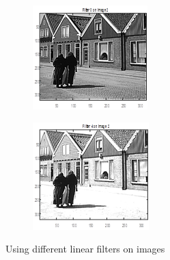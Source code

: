 \begin{figure}
\begin{subfigure}{0.4\textwidth}
        \caption{}
        \label{fig:Second}
    \end{subfigure}
    \vfill
    \begin{subfigure}{0.4\textwidth}
        \includegraphics[width=\textwidth]{Resources/F10-c.png}
        \caption{}
        \label{fig:first}
    \end{subfigure}
    \hfill
    \begin{subfigure}{0.4\textwidth}
        \includegraphics[width=\textwidth]{Resources/F10-d.png}
        \caption{}
        \label{fig:Second}
    \end{subfigure}
    \caption{Using different linear filters on images}
    \label{fig:ApplyingFilters}
\end{figure}

